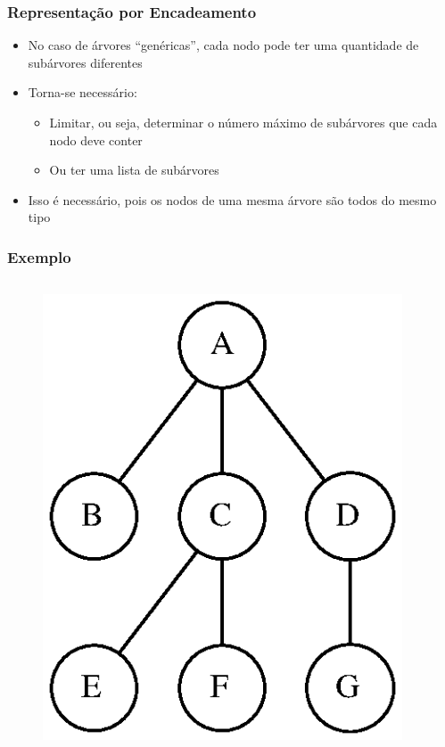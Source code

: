 \documentclass[aspectratio=169]{beamer}
\begin{document}
\begin{frame}\frametitle{Representação por Encadeamento}
\begin{itemize}
	\item  No caso de árvores ``genéricas'', cada nodo pode ter uma quantidade de subárvores diferentes
	\item Torna-se necessário:
	\begin{itemize}
		\item Limitar, ou seja, determinar o número máximo de subárvores que cada nodo deve conter
		\item Ou ter uma lista de subárvores
	\end{itemize}
	\item Isso é necessário, pois os nodos de uma mesma árvore são todos do mesmo tipo
\end{itemize}
\end{frame}

\begin{frame}\frametitle{Exemplo}
\begin{columns}[T]
\begin{column}{0.25\linewidth}
\begin{figure}[h]
	\centering
	\includegraphics[height=0.4\paperheight]{imagens/arvore_a.eps}
\end{figure}
\end{column}
\begin{column}{0.75\linewidth}
\pause
\end{column}
\end{columns}
\end{frame}
\end{document}
